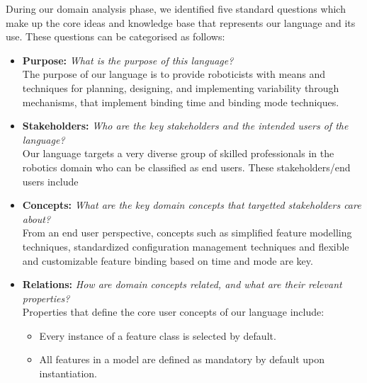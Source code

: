 \documentclass[conference]{IEEEtran}
\begin{document}
During our domain analysis phase, we identified five standard questions which make up the core ideas and knowledge base that represents our language and its use. These questions can be categorised as follows:
    \begin{itemize}
        \item \textbf{Purpose: } \textit{What is the purpose of this language?}\\
        The purpose of our language is to provide roboticists with means and techniques for planning, designing, and implementing variability through mechanisms, that implement binding time and binding mode techniques.
        \item \textbf{Stakeholders: } \textit{Who are the key stakeholders and the intended users of the language?}\\ Our language targets a very diverse group of skilled professionals in the robotics domain who can be classified as end users. These stakeholders/end users include 
        \item \textbf{Concepts: }\textit{What are the key domain concepts that targetted stakeholders care about?}\\ From an end user perspective, concepts such as simplified feature modelling techniques, standardized configuration management techniques and flexible and customizable feature binding based on time and mode are key.
        \item \textbf{Relations: }\textit{How are domain concepts related, and what are their relevant properties?}\\
        Properties that define the core user concepts of our language include:
        \begin{itemize}
            \item Every instance of a feature class is selected by default.
            \item All features in a model are defined as mandatory by default upon instantiation.

\end{itemize}
\end{itemize}
\end{document}
